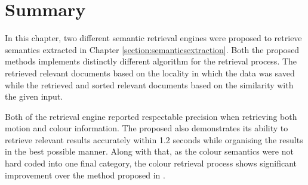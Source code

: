 \section{Summary}

In this chapter, two different semantic retrieval engines were proposed to
retrieve semantics extracted in Chapter \ref{section:semanticsextraction}.
Both the proposed methods implements distinctly different algorithm for the
retrieval process. The \versionOneRet retrieved relevant documents based on the
locality in which the data was saved while the \versionTwoRet retrieved and
sorted relevant documents based on the similarity with the given input.

Both of the retrieval engine reported respectable precision when retrieving
both motion and colour information. The proposed \versionTwoRet also
demonstrates its ability to retrieve relevant results accurately within 1.2
seconds while organising the results in the best possible manner. Along with
that, as the colour semantics were not hard coded into one final category,
the colour retrieval process shows significant improvement over the method
proposed in \versionOneRet.

